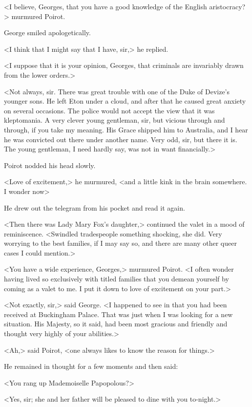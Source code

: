<I believe, Georges, that you have a good knowledge of the English aristocracy?> murmured Poirot.

George smiled apologetically.

<I think that I might say that I have, sir,> he replied.

<I suppose that it is your opinion, Georges, that criminals are invariably drawn from the lower orders.>

<Not always, sir. There was great trouble with one of the Duke of Devize's younger sons. He left Eton under a cloud, and after that he caused great anxiety on several occasions. The police would not accept the view that it was kleptomania. A very clever young gentleman, sir, but vicious through and through, if you take my meaning. His Grace shipped him to Australia, and I hear he was convicted out there under another name. Very odd, sir, but there it is. The young gentleman, I need hardly say, was not in want financially.>

Poirot nodded his head slowly.

<Love of excitement,> he murmured, <and a little kink in the brain somewhere. I wonder now\longdash>

He drew out the telegram from his pocket and read it again.

<Then there was Lady Mary Fox's daughter,> continued the valet in a mood of reminiscence. <Swindled tradespeople something shocking, she did. Very worrying to the best families, if I may say so, and there are many other queer cases I could mention.>

<You have a wide experience, Georges,> murmured Poirot. <I often wonder having lived so exclusively with titled families that you demean yourself by coming as a valet to me. I put it down to love of excitement on your part.>

<Not exactly, sir,> said George. <I happened to see in  that you had been received at Buckingham Palace. That was just when I was looking for a new situation. His Majesty, so it said, had been most gracious and friendly and thought very highly of your abilities.>

<Ah,> said Poirot, <one always likes to know the reason for things.>

He remained in thought for a few moments and then said:

<You rang up Mademoiselle Papopolous?>

<Yes, sir; she and her father will be pleased to dine with you to-night.>

